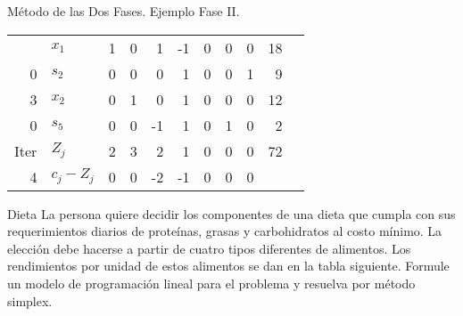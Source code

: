 \begin{frame}{Método de las Dos Fases. Ejemplo Fase II.}{}
{\begin{tabular}{rl|rrrrrrr|rr}
{      2 & $x_1$ & 1 & 0 & 1 & -1 & 0 & 0 & 0 & 18 &  \\
      0 & $s_2$ & 0 & 0 & 0 & 1 & 0 & 0 & 1 & 9 &  \\
      3 & $x_2$ & 0 & 1 & 0 & 1 & 0 & 0 & 0 & 12 &  \\
      0 & $s_5$ & 0 & 0 & -1 & 1 & 0 & 1 & 0 & 2 &  \\\midrule
      Iter & $Z_j$ & 2 & 3 & 2 & 1 & 0 & 0 & 0 & 72 &  \\
      4 & $c_j - Z_j$ & 0 & 0 & -2 & -1 & 0 & 0 & 0 &  & %
                                                         }
\end{tabular}
  \par}
\end{frame}

\begin{frameExample}{Dieta}{}
  La persona quiere decidir los componentes de una dieta que cumpla con sus requerimientos diarios de proteínas, grasas y carbohidratos al costo mínimo. La elección debe hacerse a partir de cuatro tipos diferentes de alimentos. Los rendimientos por unidad de estos alimentos se dan en la tabla siguiente. Formule un modelo de programación lineal para el problema y resuelva por método simplex.


  {\centering
    \par}    
\end{frameExample}


